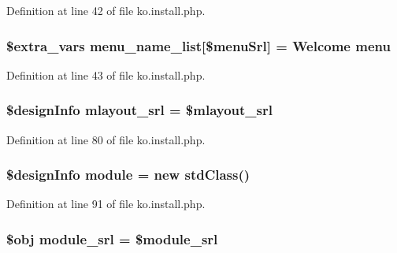 Definition at line 42 of file ko.\+install.\+php.

\hypertarget{ko_8install_8php_aab93e295f18667faa1458cf574553e1f}{}
\subsubsection[{menu\+\_\+name\+\_\+list}]{\setlength{\rightskip}{0pt plus 5cm}\${\bf extra\+\_\+vars} menu\+\_\+name\+\_\+list\mbox{[}\$menu\+Srl\mbox{]} = \textquotesingle{}Welcome {\bf menu}\textquotesingle{}}\label{ko_8install_8php_aab93e295f18667faa1458cf574553e1f}


Definition at line 43 of file ko.\+install.\+php.

\hypertarget{ko_8install_8php_a9cf497537007b08c645bed35f564be54}{}
\subsubsection[{mlayout\+\_\+srl}]{\setlength{\rightskip}{0pt plus 5cm}\$design\+Info mlayout\+\_\+srl = \$mlayout\+\_\+srl}\label{ko_8install_8php_a9cf497537007b08c645bed35f564be54}


Definition at line 80 of file ko.\+install.\+php.

\hypertarget{ko_8install_8php_a5c3fc1968f94c2b6a7c60845f284de78}{}
\subsubsection[{module}]{\setlength{\rightskip}{0pt plus 5cm}\$design\+Info {\bf module} = new std\+Class()}\label{ko_8install_8php_a5c3fc1968f94c2b6a7c60845f284de78}


Definition at line 91 of file ko.\+install.\+php.

\hypertarget{ko_8install_8php_a370bb6450fab1da3e0ed9f484a38b761}{}
\subsubsection[{module\+\_\+srl}]{\setlength{\rightskip}{0pt plus 5cm}\$obj module\+\_\+srl = \$module\+\_\+srl}\label{ko_8install_8php_a370bb6450fab1da3e0ed9f484a38b761}



